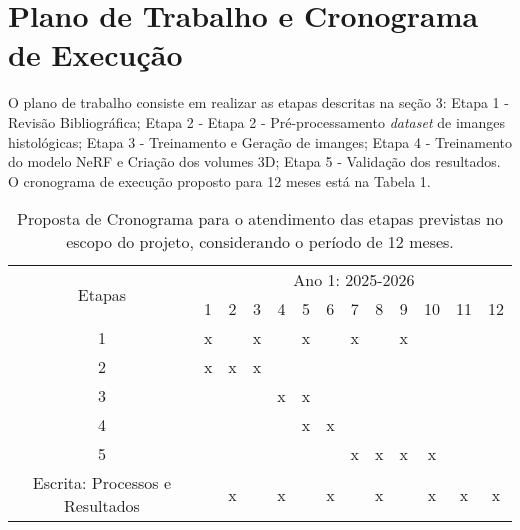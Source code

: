 \section{Plano de Trabalho e Cronograma de Execução}


O plano de trabalho consiste em realizar as etapas descritas na seção 3: Etapa 1 - Revisão Bibliográfica; Etapa 2 - Etapa 2 - Pré-processamento \textit{dataset} de imanges histológicas; Etapa 3 - Treinamento e Geração de imanges; Etapa 4 - Treinamento do modelo NeRF e Criação dos volumes 3D; Etapa 5 - Validação dos resultados. O cronograma de execução proposto para 12 meses está na Tabela 1. 

\begin{table}[h]

\caption{Proposta de Cronograma para o atendimento das etapas previstas no escopo do projeto, considerando o período de 12 meses.}

\label{tab:cronograma}
	\centering
		\begin{tabular} {|c|c|c|c|c|c|c|c|c|c|c|c|c|}
		\hline
		\multirow{2}{*}{Etapas}
		&\multicolumn{12}{c|}{Ano 1: 2025-2026}\\ \cline{2-13}
		&1&2&3&4&5&6&7&8&9&10&11&12\\
		\hline
		1&x&&x&&x&&x&&x&&&\\
		\hline
		2&x&x&x&&&&&&&&&\\
		\hline	
		3&&&&x&x&&&&&&&\\
		\hline			
		4&&&&&x&x&&&&&&\\
		\hline	
		5&&&&&&&x&x&x&x&&\\
		\hline	
		

		Escrita: Processos e Resultados&&x&&x&&x&&x&&x&x&x\\
		\hline
		\end{tabular}
\end{table}
